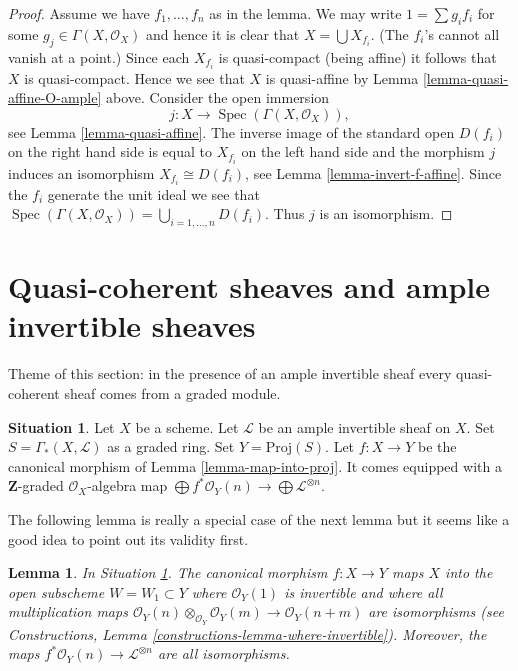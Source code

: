 \documentclass{stacks-project}
\theoremstyle{plain}
\newtheorem{lemma}[subsection]{Lemma}
\theoremstyle{definition}
\newtheorem{situation}[subsection]{Situation}
\theoremstyle{remark}
\numberwithin{equation}{subsection}
\def\Spec{\mathop{\mathrm{Spec}}}
\begin{document}
\begin{proof}
Assume we have $f_1, \ldots, f_n$ as in the lemma.
We may write $1 = \sum g_i f_i$ for some $g_j \in \Gamma(X, \mathcal{O}_X)$
and hence it is clear that $X = \bigcup X_{f_i}$. (The $f_i$'s cannot
all vanish at a point.) Since each $X_{f_i}$
is quasi-compact (being affine) it follows that $X$ is quasi-compact.
Hence we see that $X$ is quasi-affine by
Lemma \ref{lemma-quasi-affine-O-ample} above.
Consider the open immersion
$$
j : X \to \Spec(\Gamma(X, \mathcal{O}_X)),
$$
see Lemma \ref{lemma-quasi-affine}. The inverse image of the standard open
$D(f_i)$ on the right hand side is equal to $X_{f_i}$ on the
left hand side and the morphism $j$ induces an isomorphism
$X_{f_i} \cong D(f_i)$, see
Lemma \ref{lemma-invert-f-affine}. Since the $f_i$ generate the unit ideal
we see that $\Spec(\Gamma(X, \mathcal{O}_X))
= \bigcup_{i = 1, \ldots, n} D(f_i)$. Thus $j$ is an isomorphism.
\end{proof}







\section{Quasi-coherent sheaves and ample invertible sheaves}
\label{section-ample-quasi-coherent}

\noindent
Theme of this section: in the presence of an ample invertible sheaf
every quasi-coherent sheaf comes from a graded module.

\begin{situation}
\label{situation-ample}
Let $X$ be a scheme.
Let $\mathcal{L}$ be an ample invertible sheaf on $X$.
Set $S = \Gamma_*(X, \mathcal{L})$ as a graded ring.
Set $Y = \text{Proj}(S)$.
Let $f : X \to Y$ be the canonical morphism of Lemma \ref{lemma-map-into-proj}.
It comes equipped with a $\mathbf{Z}$-graded $\mathcal{O}_X$-algebra map
$\bigoplus f^*\mathcal{O}_Y(n) \to \bigoplus \mathcal{L}^{\otimes n}$.
\end{situation}

\noindent
The following lemma is really a special case of the next lemma
but it seems like a good idea to point out its validity first.

\begin{lemma}
\label{lemma-ample-gcd-is-one}
In Situation \ref{situation-ample}.
The canonical morphism $f : X \to Y$
maps $X$ into the open subscheme $W = W_1 \subset Y$
where $\mathcal{O}_Y(1)$ is invertible and where
all multiplication maps
$\mathcal{O}_Y(n) \otimes_{\mathcal{O}_Y} \mathcal{O}_Y(m) \to
\mathcal{O}_Y(n + m)$
are isomorphisms (see
Constructions, Lemma \ref{constructions-lemma-where-invertible}).
Moreover, the maps $f^*\mathcal{O}_Y(n) \to \mathcal{L}^{\otimes n}$
are all isomorphisms.
\end{lemma}
\end{document}
